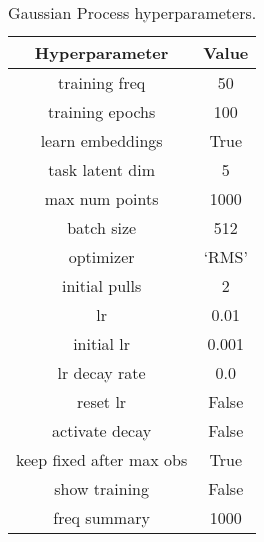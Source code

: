 \begin{table}[!h]
	\caption{Gaussian Process hyperparameters.}
	\label{tab:gp_hyperparameters}
	\vspace*{-2ex}
	\begin{center}
		\begin{tabular}{|c|c|}
			\hline
			Hyperparameter\cellcolor[gray]{0.6} & Value \cellcolor[gray]{0.6} \\ \hline
training freq & 50 \\ \hline
training epochs & 100 \\ \hline
learn embeddings & True \\ \hline
task latent dim & 5 \\ \hline
max num points & 1000 \\ \hline
batch size & 512 \\ \hline
optimizer & `RMS' \\ \hline
initial pulls & 2 \\ \hline
lr & 0.01 \\ \hline
initial lr & 0.001 \\ \hline
lr decay rate & 0.0 \\ \hline
reset lr & False \\ \hline
activate decay & False \\ \hline
keep fixed after max obs & True \\ \hline
show training & False \\ \hline
freq summary & 1000 \\ \hline
		\end{tabular}
	\end{center}
\end{table}